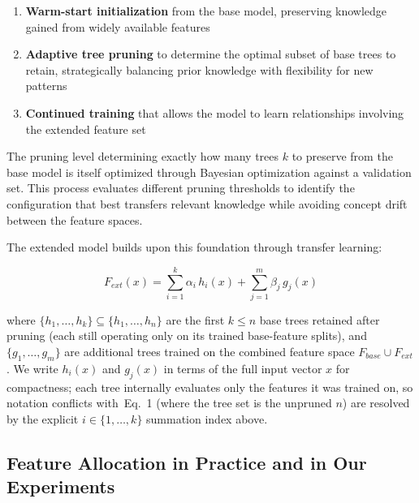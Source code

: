 \documentclass[sigconf]{acmart}
\begin{document}
\begin{itemize}
\begin{enumerate}
\item \textbf{Warm-start initialization} from the base model, preserving knowledge gained from widely available features

\item \textbf{Adaptive tree pruning} to determine the optimal subset of base trees to retain, strategically balancing prior knowledge with flexibility for new patterns

\item \textbf{Continued training} that allows the model to learn relationships involving the extended feature set
\end{enumerate}

The pruning level determining exactly how many trees $k$ to preserve from the base model is itself optimized through Bayesian optimization against a validation set. This process evaluates different pruning thresholds to identify the configuration that best transfers relevant knowledge while avoiding concept drift between the feature spaces.

The extended model builds upon this foundation through transfer learning:

\begin{equation}
F_{ext}(x) = \sum_{i=1}^{k} \alpha_i \, h_i(x) + \sum_{j=1}^{m} \beta_j \, g_j(x)
\end{equation}

where $\{h_1, \dots, h_k\} \subseteq \{h_1, \dots, h_n\}$ are the first $k\!\le\!n$ base trees retained after pruning (each still operating only on its trained base-feature splits), and $\{g_1, \dots, g_m\}$ are additional trees trained on the combined feature space $F_{base} \cup F_{ext}$. We write $h_i(x)$ and $g_j(x)$ in terms of the full input vector $x$ for compactness; each tree internally evaluates only the features it was trained on, so notation conflicts with~Eq.~1 (where the tree set is the unpruned $n$) are resolved by the explicit $i\in\{1,\dots,k\}$ summation index above.

\subsection{Feature Allocation in Practice and in Our Experiments}
\label{sec:feature-allocation}


\end{itemize}
\end{document}
